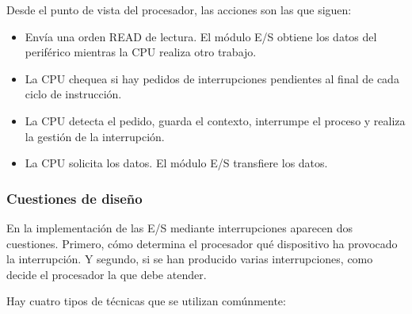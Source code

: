 Desde el punto de vista del procesador, las acciones son las que siguen:

\begin{itemize}
  \item Envía una orden READ de lectura. El módulo E/S obtiene los datos del periférico mientras la CPU realiza otro trabajo.
  \item La CPU chequea si hay pedidos de interrupciones pendientes al final de cada ciclo de instrucción.
  \item La CPU detecta el pedido, guarda el contexto, interrumpe el proceso y realiza la gestión de la interrupción.
  \item La CPU solicita los datos. El módulo E/S transfiere los datos.
\end{itemize}

\begin{subs}
  \subsubsection{Cuestiones de diseño}

  En la implementación de las E/S mediante interrupciones aparecen dos cuestiones. Primero, cómo determina el procesador qué dispositivo ha provocado la interrupción. Y segundo, si se han producido varias interrupciones, como decide el procesador la que debe atender.

  Hay cuatro tipos de técnicas que se utilizan comúnmente:


\end{subs}
